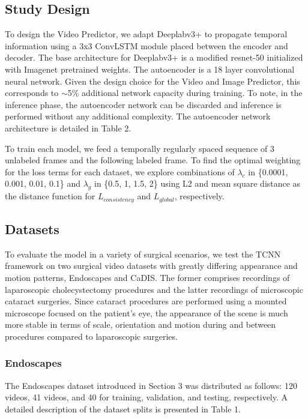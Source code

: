 \documentclass[twoside, print]{ieeecolor_arxiv}
\begin{document}
\subsection{Study Design}
To design the Video Predictor, we adapt Deeplabv3+\cite{hq1} to propagate temporal information using a 3x3 ConvLSTM \cite{clstm} module placed between the encoder and  decoder. The base architecture for Deeplabv3+ is a modified resnet-50\cite{resnet} initialized with Imagenet pretrained weights. The autoencoder is a 18 layer convolutional neural network. Given the design choice for the Video and Image Predictor, this corresponds to $\sim$5\% additional network capacity during training. To note, in the inference phase, the autoencoder network can be discarded and inference is performed without any additional complexity. The autoencoder network architecture is detailed in Table 2.

To train each model, we feed a temporally regularly spaced sequence of 3 unlabeled frames and the following labeled frame. To find the optimal weighting for the loss terms for each dataset, we explore combinations of $\lambda_{c}$ in \{0.0001, 0.001, 0.01, 0.1\} and $\lambda_{g}$ in \{0.5, 1, 1.5, 2\} using L2 and mean square distance as the distance function for $L_{consistency}$ and  $L_{global}$, respectively.




\subsection{Datasets}
To evaluate the model in a variety of surgical scenarios, we test the TCNN framework on two surgical video datasets with greatly differing appearance and motion patterns, Endoscapes and CaDIS. The former comprises recordings of laparoscopic cholecystectomy procedures and the latter recordings of microscopic cataract surgeries. Since cataract procedures are performed using a mounted microscope focused on the patient's eye, the appearance of the scene is much more stable in terms of scale, orientation and motion during and between procedures compared to laparoscopic surgeries.

\subsubsection{Endoscapes}
The Endoscapes dataset introduced in Section 3 was distributed as follows: 120 videos, 41 videos, and 40 for training, validation, and testing, respectively. A detailed description of the dataset splits is presented in Table 1.
\end{document}
